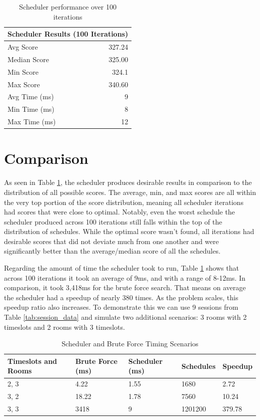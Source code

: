   
\begin{table}[h]
\centering

\begin{tabular}{| l | r |}
\hline
\multicolumn{2}{|l|}{Scheduler Results (100 Iterations)} \\
\hline
Avg Score & 327.24 \\
\hline
Median Score & 325.00 \\
\hline
Min Score & 324.1 \\
\hline
Max Score & 340.60 \\
\hline
Avg Time (ms) & 9 \\
\hline
Min Time (ms) & 8 \\
\hline
Max Time (ms) & 12 \\
\hline

\end{tabular}
\caption{Scheduler performance over 100 iterations}
\label{tab:scheduler_results}
\end{table}

\section{Comparison}
As seen in Table \ref{tab:scheduler_results}, the scheduler produces desirable results in comparison to the distribution of all possible scores. The average, min, and max scores are all within the very top portion of the score distribution, meaning all scheduler iterations had scores that were close to optimal. Notably, even the worst schedule the scheduler produced across 100 iterations still falls within the top of the distribution of schedules. While the optimal score wasn't found, all iterations had desirable scores that did not deviate much from one another and were significantly better than the average/median score of all the schedules.

Regarding the amount of time the scheduler took to run, Table \ref{tab:scheduler_results} shows that across 100 iterations it took an average of 9ms, and with a range of 8-12ms. In comparison, it took 3,418ms for the brute force search. That means on average the scheduler had a speedup of nearly 380 times. As the problem scales, this speedup ratio also increases. To demonstrate this we can use 9 sessions from Table \ref{tab:session_data} and simulate two additional scenarios: 3 rooms with 2 timeslots and 2 rooms with 3 timeslots. 

\begin{table}[h]
\centering

\begin{tabular}{|l | l | l | l | l|}
\hline
Timeslots and Rooms & Brute Force (ms) & Scheduler (ms) & Schedules & Speedup\\
\hline
2, 3 & 4.22 & 1.55 & 1680 & 2.72\\
\hline
3, 2 & 18.22 & 1.78 & 7560 & 10.24\\
\hline
3, 3 & 3418 & 9 & 1201200 & 379.78\\
\hline

\end{tabular}
\caption{Scheduler and Brute Force Timing Scenarios}
\label{tab:scheduler_and_brute_force_timings}
\end{table}

